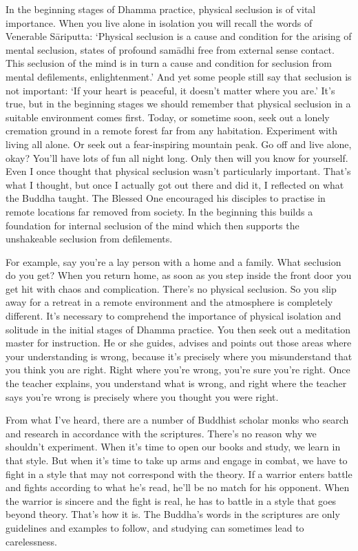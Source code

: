In the beginning stages of Dhamma practice, physical seclusion is of vital importance. When you live alone in isolation you will recall the words of Venerable S\=ariputta: `Physical seclusion is a cause and condition for the arising of mental seclusion, states of profound sam\=adhi free from external sense contact. This seclusion of the mind is in turn a cause and condition for seclusion from mental defilements, enlightenment.' And yet some people still say that seclusion is not important: `If your heart is peaceful, it doesn't matter where you are.' It's true, but in the beginning stages we should remember that physical seclusion in a suitable environment comes first. Today, or sometime soon, seek out a lonely cremation ground in a remote forest far from any habitation. Experiment with living all alone. Or seek out a fear-inspiring mountain peak. Go off and live alone, okay? You'll have lots of fun all night long. Only then will you know for yourself. Even I once thought that physical seclusion wasn't particularly important. That's what I thought, but once I actually got out there and did it, I reflected on what the Buddha taught. The Blessed One encouraged his disciples to practise in remote locations far removed from society. In the beginning this builds a foundation for internal seclusion of the mind which then supports the unshakeable seclusion from defilements.

For example, say you're a lay person with a home and a family. What seclusion do you get? When you return home, as soon as you step inside the front door you get hit with chaos and complication. There's no physical seclusion. So you slip away for a retreat in a remote environment and the atmosphere is completely different. It's necessary to comprehend the importance of physical isolation and solitude in the initial stages of Dhamma practice. You then seek out a meditation master for instruction. He or she guides, advises and points out those areas where your understanding is wrong, because it's precisely where you misunderstand that you think you are right. Right where you're wrong, you're sure you're right. Once the teacher explains, you understand what is wrong, and right where the teacher says you're wrong is precisely where you thought you were right.

From what I've heard, there are a number of Buddhist scholar monks who search and research in accordance with the scriptures. There's no reason why we shouldn't experiment. When it's time to open our books and study, we learn in that style. But when it's time to take up arms and engage in combat, we have to fight in a style that may not correspond with the theory. If a warrior enters battle and fights according to what he's read, he'll be no match for his opponent. When the warrior is sincere and the fight is real, he has to battle in a style that goes beyond theory. That's how it is. The Buddha's words in the scriptures are only guidelines and examples to follow, and studying can sometimes lead to carelessness.

